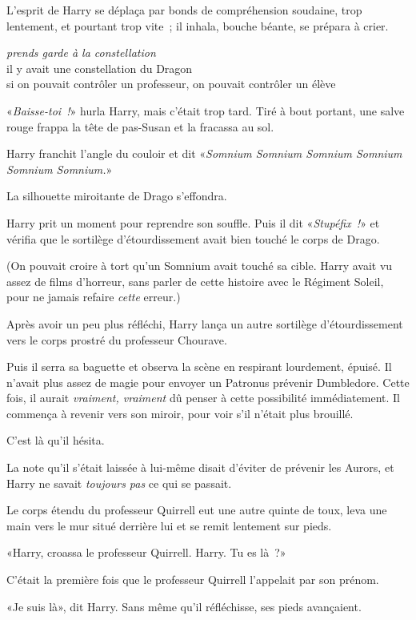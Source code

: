 L'esprit de Harry se déplaça par bonds de compréhension soudaine, trop lentement, et pourtant trop vite~; il inhala, bouche béante, se prépara à crier.

\emph{prends garde à la constellation}\\ il y avait une constellation du Dragon\\ si on pouvait contrôler un professeur, on pouvait contrôler un élève

«\emph{Baisse-toi~!}» hurla Harry, mais c'était trop tard. Tiré à bout portant, une salve rouge frappa la tête de pas-Susan et la fracassa au sol.

Harry franchit l'angle du couloir et dit «\emph{Somnium Somnium Somnium Somnium Somnium Somnium.}»

La silhouette miroitante de Drago s'effondra.

Harry prit un moment pour reprendre son souffle. Puis il dit «\emph{Stupéfix~!}» et vérifia que le sortilège d'étourdissement avait bien touché le corps de Drago.

(On pouvait croire à tort qu'un Somnium avait touché sa cible. Harry avait vu assez de films d'horreur, sans parler de cette histoire avec le Régiment Soleil, pour ne jamais refaire \emph{cette} erreur.)

Après avoir un peu plus réfléchi, Harry lança un autre sortilège d'étourdissement vers le corps prostré du professeur Chourave.

Puis il serra sa baguette et observa la scène en respirant lourdement, épuisé. Il n'avait plus assez de magie pour envoyer un Patronus prévenir Dumbledore. Cette fois, il aurait \emph{vraiment, vraiment} dû penser à cette possibilité immédiatement. Il commença à revenir vers son miroir, pour voir s'il n'était plus brouillé.

C'est là qu'il hésita.

La note qu'il s'était laissée à lui-même disait d'éviter de prévenir les Aurors, et Harry ne savait \emph{toujours pas} ce qui se passait.

Le corps étendu du professeur Quirrell eut une autre quinte de toux, leva une main vers le mur situé derrière lui et se remit lentement sur pieds.

«Harry, croassa le professeur Quirrell. Harry. Tu es là~?»

C'était la première fois que le professeur Quirrell l'appelait par son prénom.

«Je suis là», dit Harry. Sans même qu'il réfléchisse, ses pieds avançaient.

